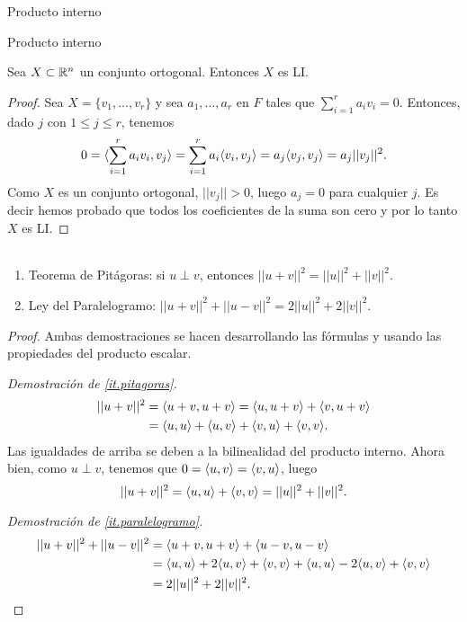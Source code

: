 \begin{chapter}{Producto interno}
\begin{section}{Producto interno}
        \begin{teorema}\label{th-ortogonal-implica-li} Sea $X \subset \mathbb R^n$ un conjunto  ortogonal. Entonces $X$ es LI. 
        \end{teorema}
        \begin{proof} Sea $X =\{v_1,\ldots,v_r \}$ y sea $a_1,\ldots,a_r$ en $F$ tales que  $\sum_{i=1}^r a_iv_i =0$. Entonces,  dado $j$ con $1 \le j \le r$,  tenemos 
            $$
            0=\langle\sum_{i=1}^r a_iv_i ,v_j \rangle = \sum_{i=1}^r a_i\langle v_i ,v_j \rangle = a_j\langle v_j ,v_j \rangle = a_j||v_j||^2.
            $$
            Como $X$  es un conjunto ortogonal,  $||v_j|| >0$, luego $a_j =0$ para cualquier $j$. Es decir hemos probado que todos los coeficientes de la suma son cero y por lo tanto $X$  es LI.
        \end{proof}
        
        
        
        \begin{proposicion}
            ${}^{}$
            \begin{enumerate}
                \item\label{it.pitagoras} Teorema de Pitágoras: si $u\perp v$, entonces $||u+v||^2 = ||u||^2 + ||v||^2$.
                \item\label{it.paralelogramo} Ley del Paralelogramo: $||u+v||^2+ ||u-v||^2 = 2||u||^2 + 2||v||^2$.
            \end{enumerate}
        \end{proposicion}
        \begin{proof} Ambas demostraciones se hacen desarrollando las fórmulas y usando las propiedades del producto escalar.
            
            \textit{Demostración de \ref{it.pitagoras}.}
            \begin{align*}
            ||u+v||^2 &= \langle u+v, u+v\rangle = \langle u, u+v\rangle+\langle v, u+v\rangle \\
            &= \langle u, u\rangle+\langle u, v\rangle+\langle v, u\rangle+\langle v, v\rangle.
            \end{align*} 
            Las igualdades de arriba se deben a la bilinealidad del producto interno. 
            Ahora bien,  como $u\perp v$,  tenemos que $0 = \langle u, v\rangle=\langle v, u\rangle$, luego
            \begin{equation*}
            ||u+v||^2 = \langle u, u\rangle+ \langle v, v\rangle =  ||u||^2 + ||v||^2.
            \end{equation*} 
            
            \textit{Demostración de \ref{it.paralelogramo}.}
            \begin{align*}
            ||u+v||^2+ ||u-v||^2 &= \langle u+v, u+v\rangle + \langle u-v, u-v\rangle \\
            &= \langle u, u\rangle+2\langle u, v\rangle+\langle v, v\rangle + \langle u, u\rangle-2\langle u, v\rangle+\langle v, v\rangle \\
            &=  2||u||^2 + 2||v||^2.
            \end{align*}
        \end{proof}
        

\end{section}
\end{chapter}
